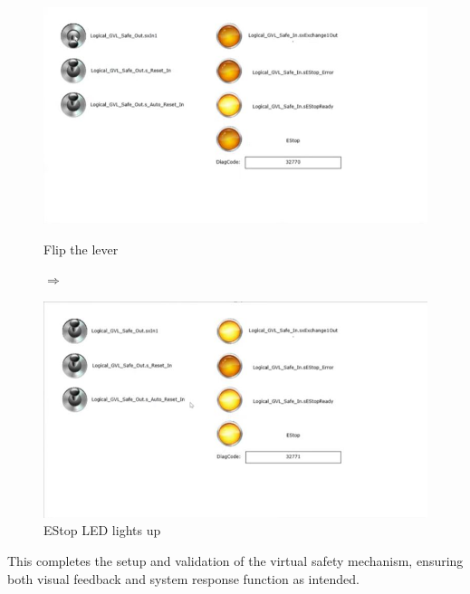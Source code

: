 \documentclass[a4paper,12pt]{article}
\begin{document}
\begin{figure}[H]
	\centering
	\begin{minipage}{0.4\textwidth}
		\centering
		\includegraphics[width=\textwidth]{c6.jpg}
		\caption{Flip the lever}
	\end{minipage}
	\hspace{0.02\textwidth}
	{\Huge$\Rightarrow$}
	\hspace{0.02\textwidth}
	\begin{minipage}{0.4\textwidth}
		\centering
		\includegraphics[width=\textwidth]{c7.jpg}
		\caption{EStop LED lights up}
	\end{minipage}
\end{figure}

This completes the setup and validation of the virtual safety mechanism, ensuring both visual feedback and system response function as intended.
\end{document}
